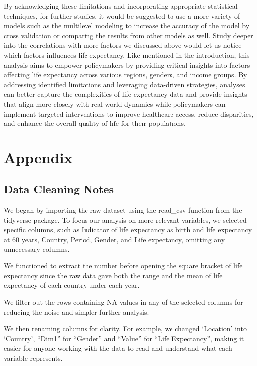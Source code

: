 \documentclass[
  letterpaper,
  DIV=11,
  numbers=noendperiod]{scrartcl}
\begin{document}
By acknowledging these limitations and incorporating appropriate
statistical techniques, for further studies, it would be suggested to
use a more variety of models such as the multilevel modeling to increase
the accuracy of the model by cross validation or comparing the results
from other models as well. Study deeper into the correlations with more
factors we discussed above would let us notice which factors influences
life expectancy. Like mentioned in the introduction, this analysis aims
to empower policymakers by providing critical insights into factors
affecting life expectancy across various regions, genders, and income
groups. By addressing identified limitations and leveraging data-driven
strategies, analyses can better capture the complexities of life
expectancy data and provide insights that align more closely with
real-world dynamics while policymakers can implement targeted
interventions to improve healthcare access, reduce disparities, and
enhance the overall quality of life for their populations.

\newpage

\appendix

\section{Appendix}\label{sec-appendix}

\subsection{Data Cleaning Notes}\label{data-cleaning-notes}

We began by importing the raw dataset using the read\_csv function from
the tidyverse package. To focus our analysis on more relevant variables,
we selected specific columns, such as Indicator of life expectancy as
birth and life expectancy at 60 years, Country, Period, Gender, and Life
expectancy, omitting any unnecessary columns.

We functioned to extract the number before opening the square bracket of
life expectancy since the raw data gave both the range and the mean of
life expectancy of each country under each year.

We filter out the rows containing NA values in any of the selected
columns for reducing the noise and simpler further analysis.

We then renaming columns for clarity. For example, we changed `Location'
into `Country', ``Dim1'' for ``Gender'' and ``Value'' for ``Life
Expectancy'', making it easier for anyone working with the data to read
and understand what each variable represents.
\end{document}
